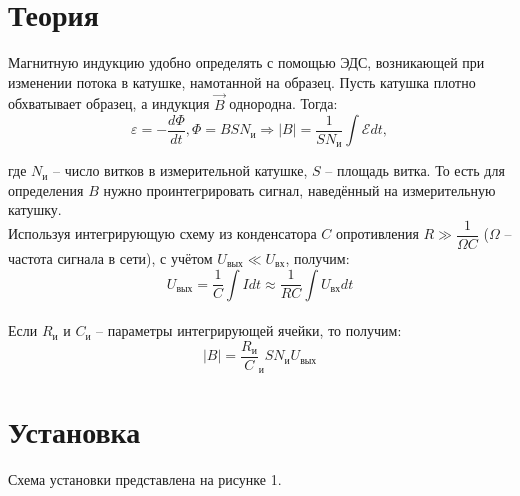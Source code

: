 

\newcommand{\formula}[3]
{
    \noindent#1\\[0.1cm]
    \begin{equation}\label{#2}
        #3
    \end{equation}
}

\newcommand{\mth}[1]
{
    \begin{math}
        #1
    \end{math}
}

\newcommand{\ruB}[1]
{
    _{\text{#1}}
}

\section{Теория}

\formula
{Магнитную индукцию удобно определять с помощью ЭДС, возникающей при изменении потока в катушке, намотанной на образец. Пусть катушка плотно обхватывает образец, а индукция $\vec{B}$ однородна. Тогда:}
{Induction1}
{\varepsilon = -\dfrac{d\Phi}{dt}, \Phi = BSN\ruB{и} \Rightarrow |B|=\dfrac{1}{SN\ruB{и}}\int \mathscr{E}dt,}

где $N\ruB{и}$ -- число витков в измерительной катушке, $S$ -- площадь витка. То есть для определения $B$ нужно проинтегрировать сигнал, наведённый на измерительную катушку. \\[0.1cm]

\formula
{Используя интегрирующую схему из конденсатора $C$ опротивления $R \gg \dfrac{1}{\Omega C}$ ($\Omega$ -- частота сигнала в сети), с учётом $U\ruB{вых} \ll U\ruB{вх}$, получим:}
{OutVoltage}
{U\ruB{вых}=\dfrac{1}{C}\int Idt \approx \dfrac{1}{RC}\int U\ruB{вх}dt} \\[0.1cm]

\formula
{Если $R_{\text{и}}$ и $C_{\text{и}}$ -- параметры интегрирующей ячейки, то получим:}
{Induction2}
{|B| = \dfrac{R\ruB{и}}C\ruB{и}{SN\ruB{и}}U\ruB{вых}}

\newpage

\section{Установка}

Схема установки представлена на рисунке 1.

